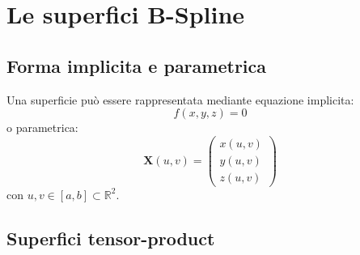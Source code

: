 \documentclass[a4paper, 12pt]{article}
\begin{document}
\section{Le superfici  B-Spline }

\subsection{Forma implicita e parametrica}

Una superficie può essere rappresentata mediante equazione implicita:
$$f(x,y,z) = 0$$
o parametrica:
$$\mathbf{X}(u, v) = \begin{pmatrix}
x(u, v) \\
y(u, v) \\
z(u, v)
\end{pmatrix}$$
con $u, v \in [a, b] \subset \mathbb{R}^2$.
\subsection{Superfici tensor-product }
\end{document}
